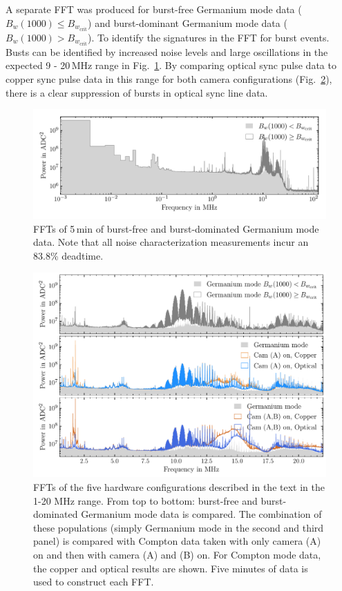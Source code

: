 A separate FFT was produced for burst-free Germanium mode data ($B_w(1000) \le B_{w_\text{crit}}$) and burst-dominant Germanium mode data ($B_w(1000) > B_{w_\text{crit}}$). To identify the signatures in the FFT for burst events. Busts can be identified by increased noise levels and large oscillations in the expected 9 - 20\,MHz range in Fig.~\ref{fig:fft_ge_log}. By comparing optical sync pulse data to copper sync pulse data in this range for both camera configurations (Fig.~\ref{fig:fft_ge}), there is a clear suppression of bursts in optical sync line data.
\begin{figure}[htb]
    \centering
	\vspace*{-10pt}
    \includegraphics[width=6in]{figs/param/fft_ge_mode_log_width_6_9in.pdf}
	\vspace*{-10mm}
    \caption{FFTs of 5\,min of burst-free and burst-dominated Germanium mode data. Note that all noise characterization measurements incur an 83.8\% deadtime.}
    \label{fig:fft_ge_log}
	\vspace*{-5pt}
\end{figure}

\begin{figure}[htb]
    \centering
    \includegraphics[width=6in]{figs/integration/ffts_5_modes.pdf}
    \caption{FFTs of the five hardware configurations described in the text in the 1-20 MHz
	range. From top to bottom: burst-free and burst-dominated Germanium mode data is compared. The combination of these populations (simply Germanium mode in the second and third panel) is compared with Compton data taken with only camera (A) on and then with camera (A) and (B) on. For Compton mode data, the copper and optical results are shown. Five minutes of data is used to construct each FFT.}
    \label{fig:fft_ge}
\end{figure}

